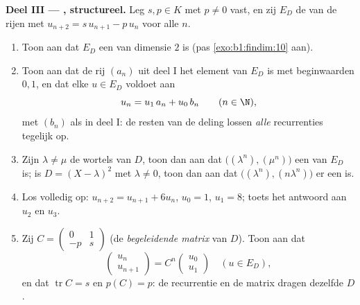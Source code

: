 \begin{problem}
\medskip
\noindent\textbf{Deel III --- ,
structureel.} Leg $s, p \in K$ met $p \neq 0$ vast, en zij $E_D$ de
 van de rijen met $u_{n+2} = s\,u_{n+1} - p\,u_n$ voor
alle $n$.
\begin{enumerate}[resume]
  \item Toon aan dat $E_D$ een  van dimensie $2$ is
        (pas \cref{exo:b1:findim:10} aan).
  \item Toon aan dat de rij $(a_n)$ uit deel I het element van
        $E_D$ is met beginwaarden $0, 1$, en dat elke $u \in E_D$
        voldoet aan
        \[
        u_n = u_1\,a_n + u_0\,b_n \qquad (n \in \N),
        \]
        met $(b_n)$ als in deel I: de resten van de deling lossen
        \emph{alle} recurrenties tegelijk op.
  \item Zijn $\lambda \neq \mu$ de wortels van $D$, toon dan aan
        dat $\bigl((\lambda^n), (\mu^n)\bigr)$ een  van $E_D$
        is; is $D = (X-\lambda)^2$ met $\lambda \neq 0$, toon dan
        aan dat $\bigl((\lambda^n), (n\lambda^n)\bigr)$ er een is.
  \item Los volledig op: $u_{n+2} = u_{n+1} + 6u_n$, $u_0 = 1$,
        $u_1 = 8$; toets het antwoord aan $u_2$ en $u_3$.
  \item Zij $C = \begin{pmatrix} 0 & 1\\ -p & s\end{pmatrix}$ (de
        \emph{begeleidende matrix} van $D$). Toon aan dat
        \[
        \begin{pmatrix} u_{n}\\ u_{n+1}\end{pmatrix}
        = C^n \begin{pmatrix} u_0\\ u_1\end{pmatrix}
        \quad (u \in E_D),
        \]
        en dat $\operatorname{tr} C = s$ en $p(C) = p$: de
        recurrentie en de matrix dragen dezelfde  $D$.
\end{enumerate}


\end{problem}
